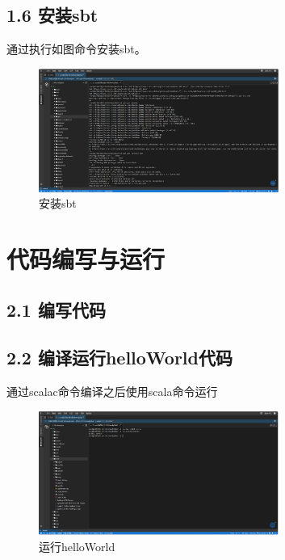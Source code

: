 \documentclass{article}
\begin{document}
\subsection*{1.6 安装sbt}
通过执行如图命令安装sbt。
\begin{figure}[H]
    \centering
    \includegraphics[width=0.7\textwidth]{./pic/21.jpg}
    \caption{安装sbt}
\end{figure}


\section{代码编写与运行}
\subsection*{2.1 编写代码}



\subsection*{2.2 编译运行helloWorld代码}
通过scalac命令编译之后使用scala命令运行
\begin{figure}[H]
    \centering
    \includegraphics[width=0.7\textwidth]{./pic/19.jpg}
    \caption{运行helloWorld}
\end{figure}
\end{document}
